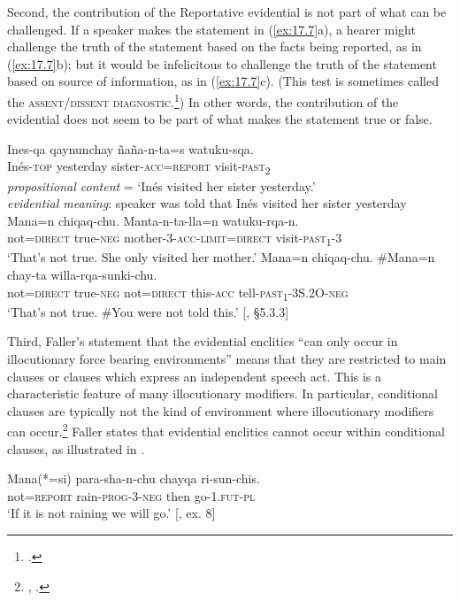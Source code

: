 Second, the contribution of the Reportative evidential is not part of what can be challenged. If a speaker makes the statement in (\ref{ex:17.7}a), a hearer might challenge the truth of the statement based on the facts being reported, as in (\ref{ex:17.7}b); but it would be infelicitous to challenge the truth of the statement based on source of information, as in (\ref{ex:17.7}c). (This test is sometimes called the \textsc{assent/dissent diagnostic}.\footnote{\citet{Papafragou2006}.}) In other words, the contribution of the evidential does not seem to be part of what makes the statement true or false.


\ea \label{ex:17.7}
\ea 
\gll Ines-qa  qaynunchay  ñaña-n-ta=s  watuku-sqa.\\
Inés-\textsc{top}  yesterday  sister-\textsc{acc}=\textsc{report}  visit\textsc{-past}\textsc{\textsubscript{2}}\\
\glt \textit{propositional content} = ‘Inés visited her sister yesterday.’\\
\textit{evidential meaning}: speaker was told that Inés visited her sister yesterday
\ex \gll  Mana=n  chiqaq-chu.  Manta-n-ta-lla=n  watuku-rqa-n.\\
not=\textsc{direct}  true-\textsc{neg}  mother-3-\textsc{acc}-\textsc{limit}=\textsc{direct}  visit-\textsc{past\textsubscript{1}}-3\\
\glt ‘That’s not true. She only visited her mother.’
\ex \gll  Mana=n  chiqaq-chu.  \#Mana=n  chay-ta  willa-rqa-sunki-chu.\\
not=\textsc{direct}  true-\textsc{neg}  not=\textsc{direct}  this-\textsc{acc}  tell\textsc{-past}\textsc{\textsubscript{1}}-3S.2O-\textsc{neg}\\
\glt ‘That’s not true. \#You were not told this.’  [\citealt{Faller2002}, §5.3.3]
\z \z


Third, Faller’s statement that the evidential enclitics “can only occur in illocutionary force bearing environments” means that they are restricted to main clauses or clauses which express an independent speech act. This is a characteristic feature of many illocutionary modifiers. In particular, conditional clauses are typically not the kind of environment where illocutionary modifiers can occur.\footnote{\citet{Ernst2009}, \citet{Haegeman2010a}.} Faller states that evidential enclitics cannot occur within conditional clauses, as illustrated in .


\ea \label{ex:17.8}
\gll Mana(*=si)  para-sha-n-chu  chayqa  ri-sun-chis.\\
not=\textsc{report}  rain-\textsc{prog}-3-\textsc{neg}  then  go-1\textsc{.fut}-\textsc{pl}\\
\glt ‘If it is not raining we will go.’  [\citealt{Faller2003}, ex. 8]
\z


